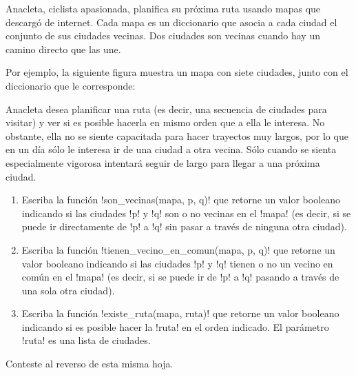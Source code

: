 Anacleta, ciclista apasionada,
planifica su próxima ruta
usando mapas que descargó de internet.
Cada mapa es un diccionario
que asocia a cada ciudad
el conjunto de sus ciudades vecinas.
Dos ciudades son vecinas
cuando hay un camino directo que las une.

Por ejemplo,
la siguiente figura muestra un mapa con siete ciudades,
junto con el diccionario que le corresponde:

\begin{minipage}[T]{.45\textwidth}
\end{minipage}
\hfil
\begin{minipage}[T]{.45\textwidth}
  
\end{minipage}

Anacleta desea planificar una ruta
(es decir, una secuencia de ciudades para visitar)
y ver si es posible hacerla en mismo orden que a ella le interesa.
No obstante,
ella no se siente capacitada para hacer trayectos muy largos,
por lo que en un día sólo le interesa ir de una ciudad a otra vecina.
Sólo cuando se sienta especialmente vigorosa
intentará seguir de largo para llegar a una próxima ciudad.

\begin{enumerate}[leftmargin=0pt,label=\emph{\alph*})]
  \item
    Escriba la función \li!son_vecinas(mapa, p, q)!
    que retorne un valor booleano
    indicando si las ciudades \li!p! y \li!q!
    son o no vecinas en el \li!mapa!
    (es decir, si se puede ir directamente de \li!p! a \li!q!
    sin pasar a través de ninguna otra ciudad).
    
  \item
    Escriba la función \li!tienen_vecino_en_comun(mapa, p, q)!
    que retorne un valor booleano
    indicando si las ciudades \li!p! y \li!q!
    tienen o no un vecino en común en el \li!mapa!
    (es decir, si se puede ir de \li!p! a \li!q!
    pasando a través de una sola otra ciudad).
    
  \item
    Escriba la función \li!existe_ruta(mapa, ruta)!
    que retorne un valor booleano
    indicando si es posible hacer la \li!ruta! en el orden indicado.
    El parámetro \li!ruta! es una lista de ciudades.
    
\end{enumerate}

Conteste al reverso de esta misma hoja.

